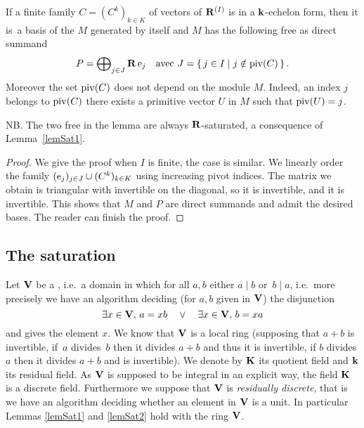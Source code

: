 
\begin{lemma} \label{lemSat2}\label{lemEchStrict}
If a finite family $C=(C^k)_{k\in K}$ of vectors of $\mathbf{R}^{(I)}$
is in a $\mathbf{k}$-echelon form, then it is~a basis of the \Rmo $M$ generated by itself  and $M$ has the following free \Rmo
as direct summand
\[
 P= \bigoplus\nolimits_{j\in J}\mathbf{R}\,\mathrm{e}_j\quad \hbox{avec } J=\left\{{\,j\in I\mid j\notin \mathrm{piv}(C)\,}\right\}.
 \]
Moreover the set $\mathrm{piv}(C)$ does not depend on the module $M$. Indeed, an index $j$ belongs to $\mathrm{piv}(C)$ \ssi there exists a primitive vector $U$
in $M$ such that $\mathrm{piv}(U)=j$.
\end{lemma}
NB. The two free \Rmos in the lemma are always $\mathbf{R}$-saturated, a consequence of  Lemma~\ref{lemSat1}.
%
\begin{proof}
We give the proof when $I$ is finite, the \gnl case is similar.
We linearly order the family  $(\mathrm{e}_j)_{j\in J} \cup (C^{k})_{k\in K}$ using increasing pivot indices.
The  matrix we obtain is \rdt triangular with invertible \coes on the diagonal, so it is \rdt invertible, and it is invertible. This shows that  $M$ and $P$ are direct summands and admit the desired bases. The reader can finish the proof.
\end{proof}
%

\subsection*{The saturation \algo}

\begin{context} \label{context1}

\noindent Let $\mathbf{V}$ be a \ddv, i.e.\ a domain in which for all  $a,b$
either $a\mid b$ or~$b\mid a$, i.e.\ more precisely we have an algorithm deciding   (for $a,b$ given in $\mathbf{V}$) the disjunction
\[
\exists x\in\mathbf{V},\,a=xb\quad \vee\quad \exists x\in\mathbf{V},\,b=xa
\]
and gives the element  $x$.
We know that $\mathbf{V}$ is a local ring (supposing that $a+b$ is invertible, if~$a$ divides~$b$ then it divides  $a+b$ and thus it is invertible, if $b$ divides $a$ then it divides $a+b$ and is invertible).
We denote by $\mathbf{K}$ its quotient field and $\mathbf{k}$ its residual field.
As $\mathbf{V}$ is supposed to be integral in an explicit way, the field $\mathbf{K}$
is a discrete field.
Furthermore we suppose that $\mathbf{V}$ is  \textsl{residually discrete}, that is we have an algorithm deciding whether an element in  $\mathbf{V}$
is a unit. In particular Lemmas \ref{lemSat1} and \ref{lemSat2} hold with the ring   $\mathbf{V}$.
\end{context}

